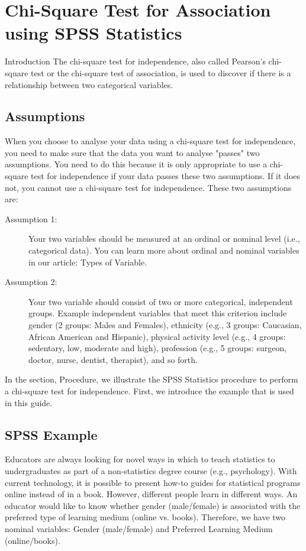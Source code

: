 \documentclass[00-IntroStatsMaster.tex]{subfiles}
\begin{document}
\section{Chi-Square Test for Association using SPSS Statistics}

Introduction
The chi-square test for independence, also called Pearson's chi-square test or the chi-square test of association, is used to discover if there is a relationship between two categorical variables.


\subsection{Assumptions}
When you choose to analyse your data using a chi-square test for independence, you need to make sure that the data you want to analyse "passes" two assumptions. You need to do this because it is only appropriate to use a chi-square test for independence if your data passes these two assumptions. If it does not, you cannot use a chi-square test for independence. These two assumptions are:

\begin{description}
	\item[Assumption 1:] Your two variables should be measured at an ordinal or nominal level (i.e., categorical data). You can learn more about ordinal and nominal variables in our article: Types of Variable.
	\item[Assumption 2:] Your two variable should consist of two or more categorical, independent groups. Example independent variables that meet this criterion include gender (2 groups: Males and Females), ethnicity (e.g., 3 groups: Caucasian, African American and Hispanic), physical activity level (e.g., 4 groups: sedentary, low, moderate and high), profession (e.g., 5 groups: surgeon, doctor, nurse, dentist, therapist), and so forth.
\end{description}
In the section, Procedure, we illustrate the SPSS Statistics procedure to perform a chi-square test for independence. First, we introduce the example that is used in this guide.


\subsection{SPSS Example}
Educators are always looking for novel ways in which to teach statistics to undergraduates as part of a non-statistics degree course (e.g., psychology). With current technology, it is possible to present how-to guides for statistical programs online instead of in a book. However, different people learn in different ways. An educator would like to know whether gender (male/female) is associated with the preferred type of learning medium (online vs. books). Therefore, we have two nominal variables: Gender (male/female) and Preferred Learning Medium (online/books).
\end{document}
